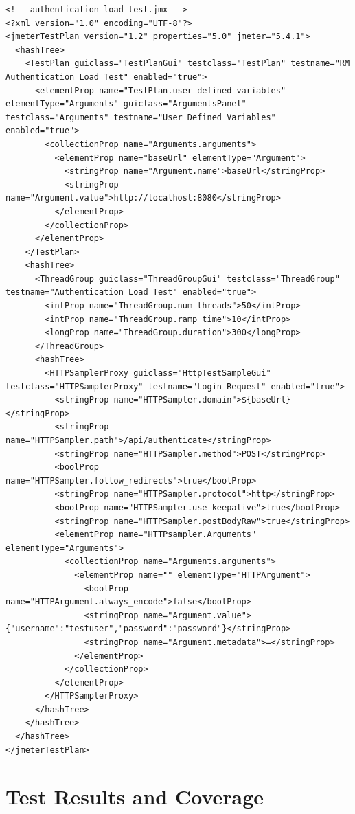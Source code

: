 \begin{lstlisting}
<!-- authentication-load-test.jmx -->
<?xml version="1.0" encoding="UTF-8"?>
<jmeterTestPlan version="1.2" properties="5.0" jmeter="5.4.1">
  <hashTree>
    <TestPlan guiclass="TestPlanGui" testclass="TestPlan" testname="RM Authentication Load Test" enabled="true">
      <elementProp name="TestPlan.user_defined_variables" elementType="Arguments" guiclass="ArgumentsPanel" testclass="Arguments" testname="User Defined Variables" enabled="true">
        <collectionProp name="Arguments.arguments">
          <elementProp name="baseUrl" elementType="Argument">
            <stringProp name="Argument.name">baseUrl</stringProp>
            <stringProp name="Argument.value">http://localhost:8080</stringProp>
          </elementProp>
        </collectionProp>
      </elementProp>
    </TestPlan>
    <hashTree>
      <ThreadGroup guiclass="ThreadGroupGui" testclass="ThreadGroup" testname="Authentication Load Test" enabled="true">
        <intProp name="ThreadGroup.num_threads">50</intProp>
        <intProp name="ThreadGroup.ramp_time">10</intProp>
        <longProp name="ThreadGroup.duration">300</longProp>
      </ThreadGroup>
      <hashTree>
        <HTTPSamplerProxy guiclass="HttpTestSampleGui" testclass="HTTPSamplerProxy" testname="Login Request" enabled="true">
          <stringProp name="HTTPSampler.domain">${baseUrl}</stringProp>
          <stringProp name="HTTPSampler.path">/api/authenticate</stringProp>
          <stringProp name="HTTPSampler.method">POST</stringProp>
          <boolProp name="HTTPSampler.follow_redirects">true</boolProp>
          <stringProp name="HTTPSampler.protocol">http</stringProp>
          <boolProp name="HTTPSampler.use_keepalive">true</boolProp>
          <stringProp name="HTTPSampler.postBodyRaw">true</stringProp>
          <elementProp name="HTTPsampler.Arguments" elementType="Arguments">
            <collectionProp name="Arguments.arguments">
              <elementProp name="" elementType="HTTPArgument">
                <boolProp name="HTTPArgument.always_encode">false</boolProp>
                <stringProp name="Argument.value">{"username":"testuser","password":"password"}</stringProp>
                <stringProp name="Argument.metadata">=</stringProp>
              </elementProp>
            </collectionProp>
          </elementProp>
        </HTTPSamplerProxy>
      </hashTree>
    </hashTree>
  </hashTree>
</jmeterTestPlan>
\end{lstlisting}

\section{Test Results and Coverage}

